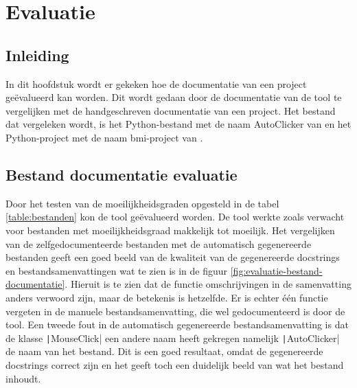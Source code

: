 \section{Evaluatie}
\label{sec:project-documentatie-evaluatie}

\subsection{Inleiding}
\label{sec:project-documentatie-evaluatie-inleiding}

In dit hoofdstuk wordt er gekeken hoe de documentatie van een project geëvalueerd kan worden.
Dit wordt gedaan door de documentatie van de tool te vergelijken met de handgeschreven documentatie van een project.
Het bestand dat vergeleken wordt, is het Python-bestand met de naam AutoClicker van \textcite{Waegeneer2022} en het Python-project met de naam bmi-project van \textcite{Simmons2019}.

\subsection{Bestand documentatie evaluatie}
\label{sec:project-documentatie-evaluatie-bestand}

Door het testen van de moeilijkheidsgraden opgesteld in de tabel \ref{table:bestanden} kon de tool geëvalueerd worden.
De tool werkte zoals verwacht voor bestanden met moeilijkheidsgraad makkelijk tot moeilijk.
Het vergelijken van de zelfgedocumenteerde bestanden met de automatisch gegenereerde bestanden geeft een goed beeld van de kwaliteit van de gegenereerde docstrings en bestandsamenvattingen wat te zien is in de figuur \ref{fig:evaluatie-bestand-documentatie}.
Hieruit is te zien dat de functie omschrijvingen in de samenvatting anders verwoord zijn, maar de betekenis is hetzelfde.
Er is echter één functie vergeten in de manuele bestandsamenvatting, die wel gedocumenteerd is door de tool.
Een tweede fout in de automatisch gegenereerde bestandsamenvatting is dat de klasse \texttt|MouseClick| een andere naam heeft gekregen namelijk \texttt|AutoClicker| de naam van het bestand.
Dit is een goed resultaat, omdat de gegenereerde docstrings correct zijn en het geeft toch een duidelijk beeld van wat het bestand inhoudt.


